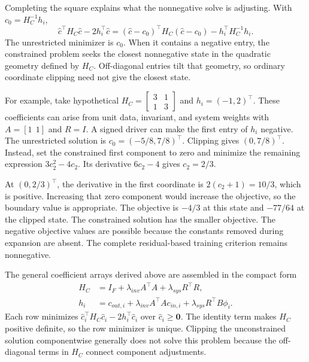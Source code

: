 Completing the square explains what the nonnegative solve is adjusting. With \(c_0=H_C^{-1}h_i\),
\begin{equation}
\label{eq:icsor_state_completed_square}
\widehat c^\top H_C\widehat c-2h_i^\top\widehat c
=(\widehat c-c_0)^\top H_C(\widehat c-c_0)
-h_i^\top H_C^{-1}h_i.
\end{equation}
The unrestricted minimizer is \(c_0\). When it contains a negative entry, the constrained problem seeks the closest nonnegative state in the quadratic geometry defined by \(H_C\). Off-diagonal entries tilt that geometry, so ordinary coordinate clipping need not give the closest state.

For example, take hypothetical \(H_C=\begin{bmatrix}3&1\\1&3\end{bmatrix}\) and \(h_i=(-1,2)^\top\). These coefficients can arise from unit data, invariant, and system weights with \(A=[1\ \ 1]\) and \(R=I\). A signed driver can make the first entry of \(h_i\) negative. The unrestricted solution is \(c_0=(-5/8,7/8)^\top\). Clipping gives \((0,7/8)^\top\). Instead, set the constrained first component to zero and minimize the remaining expression \(3c_2^2-4c_2\). Its derivative \(6c_2-4\) gives \(c_2=2/3\).

At \((0,2/3)^\top\), the derivative in the first coordinate is \(2(c_2+1)=10/3\), which is positive. Increasing that zero component would increase the objective, so the boundary value is appropriate. The objective is \(-4/3\) at this state and \(-77/64\) at the clipped state. The constrained solution has the smaller objective. The negative objective values are possible because the constants removed during expansion are absent. The complete residual-based training criterion remains nonnegative.

The general coefficient arrays derived above are assembled in the compact form
\begin{equation}
\label{eq:icsor_state_update}
\begin{aligned}
H_C&=I_F+\lambda_{inv}A^\top A+\lambda_{sys}R^\top R,\\
h_i&=c_{out,i}+\lambda_{inv}A^\top A c_{in,i}
+\lambda_{sys}R^\top B\phi_i.
\end{aligned}
\end{equation}
Each row minimizes \(\widehat c_i^\top H_C\widehat c_i-2h_i^\top\widehat c_i\) over \(\widehat c_i\geq\mathbf{0}\). The identity term makes \(H_C\) positive definite, so the row minimizer is unique. Clipping the unconstrained solution componentwise generally does not solve this problem because the off-diagonal terms in \(H_C\) connect component adjustments.

